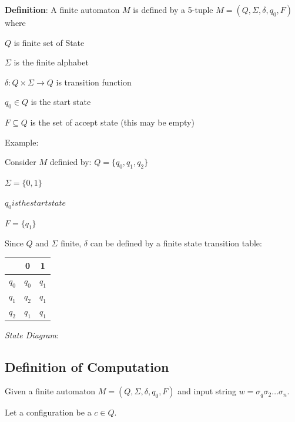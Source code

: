\documentclass[oneside, 12pt]{book}
\begin{document}
\textbf{Definition}: A finite automaton $M$ is defined by a 5-tuple $M=(Q,\Sigma, \delta, q_{0},F)$ where

$Q$ is finite set of State

$\Sigma$ is the finite alphabet

$\delta: Q\times \Sigma\to Q$ is transition function

$q_{0}\in Q$ is the start state

$F\subseteq Q$ is the set of accept state (this may be empty)

Example:

Consider $M$ definied by:
$Q=\{q_{0}, q_{1}, q_{2}\}$

$\Sigma=\{0,1\}$

$q_{0} is the start state$

$F=\{q_{1}\}$

Since $Q$ and $\Sigma$ finite, $\delta$ can be defined by a finite state transition table:

\begin{center}
  \begin{tabular}{| c | c |c | }
    \hline
     & 0 & 1\\
    \hline
    $q_{0}$ & $q_{0}$ & $q_{1}$\\
    $q_{1}$ & $q_{2}$ & $q_{1}$\\
    $q_{2}$ & $q_{1}$ & $q_{1}$\\
    \hline
  \end{tabular}
\end{center}


\emph{State Diagram}:



\subsection{Definition of Computation}

Given a finite automaton $M=(Q,\Sigma, \delta, q_{0}, F)$ and input string $w=\sigma_{q}\sigma_{2}\dots \sigma_{n}$.

Let a configuration be a $c\in Q$.
\end{document}
